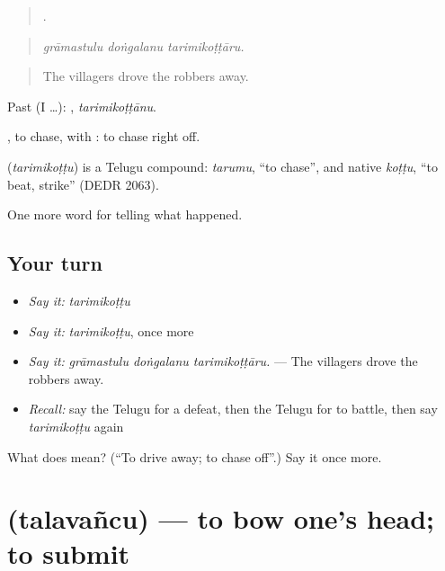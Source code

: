 \begin{quote}
  .
\end{quote}

\begin{quote}
\emph{grāmastulu doṅgalanu tarimikoṭṭāru.}
\end{quote}

\begin{quote}
The villagers drove the robbers away.
\end{quote}

Past (I …): , \emph{tarimikoṭṭānu}.

, to chase, with : to chase right off.

\begin{cousinweb}
\textbf{} (\emph{tarimikoṭṭu}) is a Telugu compound: \emph{tarumu}, \textquotedblleft{}to chase\textquotedblright{}, and native \emph{koṭṭu}, \textquotedblleft{}to beat, strike\textquotedblright{} (DEDR 2063).
\end{cousinweb}

\begin{grammarlens}[title={What you've built}]
One more word for telling what happened.
\end{grammarlens}

\subsection*{Your turn}
\begin{itemize}
\raggedright
  \item \emph{Say it:} \emph{tarimikoṭṭu}
  \item \emph{Say it:} \emph{tarimikoṭṭu}, once more
  \item \emph{Say it:} \emph{grāmastulu doṅgalanu tarimikoṭṭāru.} — The villagers drove the robbers away.
  \item \emph{Recall:} say the Telugu for a defeat, then the Telugu for to battle, then say \emph{tarimikoṭṭu} again
\end{itemize}

\begin{tcolorbox}[breakable,colback=teal!4,colframe=teal!35!black,title={Before you move on}]
What does  mean? (\textquotedblleft{}To drive away; to chase off\textquotedblright{}.) Say it once more.
\end{tcolorbox}
\section[\texorpdfstring{\te{తలవంచు} (talavañcu)}{తలవంచు (talavañcu)}]{ (talavañcu) — to bow one's head; to submit}

